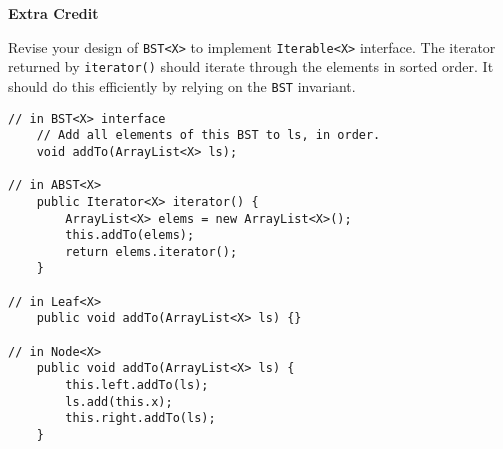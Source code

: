 \documentclass[12pt]{article}                   %
\def\pts#1{\marginpar{\footnotesize \raggedright  \fbox{#1 {\sc Points}}}}
\newenvironment{solution}{\color{Red}}{}
\begin{document}
\begin{problem}  \pts{5}

{\bf Extra Credit}

\noindent
Revise your design of \texttt{BST<X>} to implement
 \texttt{Iterable<X>} interface.  The iterator returned by
 \texttt{iterator()} should iterate through the elements in sorted order.
 It should do this efficiently by relying on the \texttt{BST} invariant.

\begin{solution}
\begin{verbatim}
// in BST<X> interface
    // Add all elements of this BST to ls, in order.
    void addTo(ArrayList<X> ls);

// in ABST<X>
    public Iterator<X> iterator() {
        ArrayList<X> elems = new ArrayList<X>();
        this.addTo(elems);
        return elems.iterator();
    }

// in Leaf<X>
    public void addTo(ArrayList<X> ls) {}

// in Node<X>
    public void addTo(ArrayList<X> ls) {
        this.left.addTo(ls);
        ls.add(this.x);
        this.right.addTo(ls);
    }
\end{verbatim}
\end{solution}

\end{problem}

\end{document}
